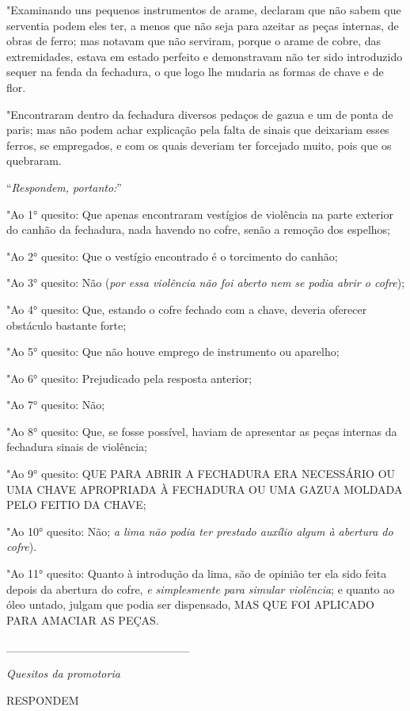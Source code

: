 "Examinando uns pequenos instrumentos de arame, declaram que não sabem
que serventia podem eles ter, a menos que não seja para azeitar as peças
internas, de obras de ferro; mas notavam que não serviram, porque o
arame de cobre, das extremidades, estava em estado perfeito e
demonstravam não ter sido introduzido sequer na fenda da fechadura, o
que logo lhe mudaria as formas de chave e de flor.

"Encontraram dentro da fechadura diversos pedaços de gazua e um de ponta
de paris; mas não podem achar explicação pela falta de sinais que
deixariam esses ferros, se empregados, e com os quais deveriam ter
forcejado muito, pois que os quebraram.

``\emph{Respondem, portanto:}''

"Ao 1° quesito: Que apenas encontraram vestígios de violência na parte
exterior do canhão da fechadura, nada havendo no cofre, senão a remoção
dos espelhos;

"Ao 2° quesito: Que o vestígio encontrado é o torcimento do canhão;

"Ao 3° quesito: Não (\emph{por essa violência não foi aberto nem se
podia abrir o cofre});

"Ao 4° quesito: Que, estando o cofre fechado com a chave, deveria
oferecer obstáculo bastante forte;

"Ao 5° quesito: Que não houve emprego de instrumento ou aparelho;

"Ao 6° quesito: Prejudicado pela resposta anterior;

"Ao 7° quesito: Não;

"Ao 8° quesito: Que, se fosse possível, haviam de apresentar as peças
internas da fechadura sinais de violência;

"Ao 9° quesito: QUE PARA ABRIR A FECHADURA ERA NECESSÁRIO OU UMA CHAVE
APROPRIADA À FECHADURA OU UMA GAZUA MOLDADA PELO FEITIO DA CHAVE;

"Ao 10° quesito: Não; \emph{a lima não podia ter prestado auxílio algum
à abertura do cofre}).

"Ao 11° quesito: Quanto à introdução da lima, são de opinião ter ela
sido feita depois da abertura do cofre, \emph{e simplesmente para
simular violência}; e quanto ao óleo untado, julgam que podia ser
dispensado, MAS QUE FOI APLICADO PARA AMACIAR AS PEÇAS.

\_\_\_\_\_\_\_\_\_\_\_\_\_\_\_\_\_\_\_\_\_\_

\emph{Quesitos da promotoria}

RESPONDEM

